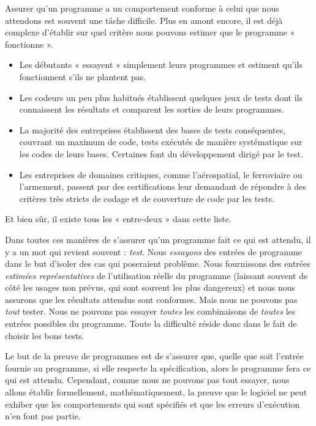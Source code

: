 

Assurer qu'un programme a un comportement conforme à celui que nous attendons
est souvent une tâche difficile. Plus en amont encore, il est déjà complexe
d'établir sur quel critère nous pouvons estimer que le programme « fonctionne ».



\begin{itemize}
\item Les débutants « essayent » simplement leurs programmes et estiment qu'ils
fonctionnent s'ils ne plantent pas.
\item Les codeurs un peu plus habitués établissent quelques jeux de tests dont ils
connaissent les résultats et comparent les sorties de leurs programmes.
\item La majorité des entreprises établissent des bases de tests conséquentes,
couvrant un maximum de code, tests exécutés de manière systématique sur les
codes de leurs bases. Certaines font du développement dirigé par le test.
\item Les entreprises de domaines critiques, comme l'aérospatial, le ferroviaire ou
l'armement, passent par des certifications leur demandant de répondre à des
critères très stricts de codage et de couverture de code par les tests.
\end{itemize}


Et bien sûr, il existe tous les « entre-deux » dans cette liste.



Dans toutes ces manières de s'assurer qu'un programme fait ce qui est attendu,
il y a un mot qui revient souvent : \textit{test}. Nous \textit{essayons} des entrées de
programme dans le but d'isoler des cas qui poseraient problème. Nous fournissons
des entrées \textit{estimées représentatives} de l'utilisation réelle du programme
(laissant souvent de côté les usages non prévus, qui sont souvent les plus
dangereux) et
nous nous assurons que les résultats attendus sont conformes. Mais nous ne
pouvons pas \textit{tout} tester. Nous ne pouvons pas essayer \textit{toutes} les
combinaisons de \textit{toutes} les entrées possibles du programme. Toute la
difficulté réside donc dans le fait de choisir les bons tests.



Le but de la preuve de programmes est de s'assurer que, quelle que soit l'entrée
fournie au programme, si elle respecte la spécification, alors le programme
fera ce qui est attendu. Cependant, comme nous ne pouvons pas tout essayer, nous
allons établir formellement, mathématiquement, la preuve que le logiciel ne
peut exhiber que les comportements qui sont spécifiés et que les erreurs
d'exécution n'en font pas partie.



